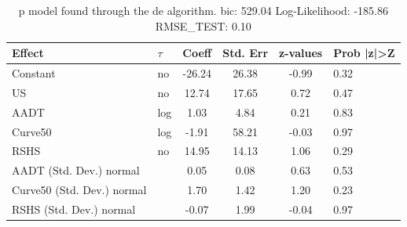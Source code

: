 \begin{table}
	\caption{p model found through the de algorithm. bic: 529.04 Log-Likelihood: -185.86 RMSE_TEST: 0.10}
	\begin{center}
		\begin{tabular}{|l|l|c|c|c|l|}
			\hline
			Effect & $\tau$ & Coeff & Std. Err & z-values & Prob |z|>Z \\
			\hline
			Constant & no & -26.24 & 26.38 & -0.99 & 0.32 \\
			\hline
			US & no & 12.74 & 17.65 & 0.72 & 0.47 \\
			\hline
			AADT & log & 1.03 & 4.84 & 0.21 & 0.83 \\
			\hline
			Curve50 & log & -1.91 & 58.21 & -0.03 & 0.97 \\
			\hline
			RSHS & no & 14.95 & 14.13 & 1.06 & 0.29 \\
			\hline
			AADT (Std. Dev.) normal &  & 0.05 & 0.08 & 0.63 & 0.53 \\
			\hline
			Curve50 (Std. Dev.) normal &  & 1.70 & 1.42 & 1.20 & 0.23 \\
			\hline
			RSHS (Std. Dev.) normal &  & -0.07 & 1.99 & -0.04 & 0.97 \\
			\hline
		\end{tabular}
	\end{center}
\end{table}